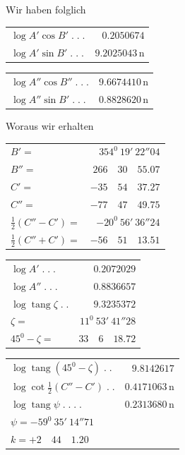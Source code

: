 \noindent Wir haben folglich
\begin{center}\small
\begin{minipage}[t]{.49\textwidth}\centering
\begin{tabular}[t]{@{}lr@{}}
$\log A'\cos B'\;.\;.\;.$&$0.2050674$\\
$\log A'\sin B'\;.\;.\;.$&$9.2025043\,\mathrm n$
\end{tabular}
\end{minipage}\hfill
\begin{minipage}[t]{.49\textwidth}\centering
\begin{tabular}[t]{@{}lr@{}}
$\log A''\cos B''\;.\;.\;.$&$9.6674410\,\mathrm n$\\
$\log A''\sin B'\;.\;.\;.$&$0.8828620\,\mathrm n$
\end{tabular}
\end{minipage}
\end{center}
\noindent Woraus wir erhalten
\begin{center}\small
\begin{minipage}[t]{.49\textwidth}\centering
\begin{tabular}[t]{@{}lr@{}}
$B'=$&$354^0\ 19'\ 22''04$\\
$B''=$&$266\quad30\quad55.07$\\[6pt]
$C'=$&$-35\quad54\quad37.27$\\
$C''=$&$-77\quad47\quad49.75$\\[6pt]
$\tfrac12(C''-C')=$&$-20^0\ 56'\ 36''24$\\
$\tfrac12(C''+C')=$&$-56\quad51\quad13.51$
\end{tabular}
\end{minipage}\hfill
\begin{minipage}[t]{.49\textwidth}\centering
\begin{tabular}[t]{@{}lr@{}}
$\log A'\;.\;.\;.$&$0.2072029$\\
$\log A''\;.\;.\;.$&$0.8836657$\\[6pt]
$\log\operatorname{tang}\zeta\;.\;.$&$9.3235372$\\
$\zeta=$&$11^0\ 53'\ 41''28$\\[6pt]
$45^0-\zeta=$&$33\quad6\quad18.72$
\end{tabular}
\end{minipage}
\par\medskip
\begin{tabular}{lr}
$\log\operatorname{tang}(45^0-\zeta)\;.\;.$&$9.8142617$\\
$\log\cot\tfrac12(C''-C')\;.\;.$&$0.4171063\,\mathrm n$\\\hline
$\log\operatorname{tang}\psi\;.\;.\;.\;.$&$0.2313680\,\mathrm n$\\
\multicolumn{2}{l}{$\psi=-59^0\ 35'\ 14''71$}\\
\multicolumn{2}{l}{$k=+2\quad44\quad1.20$}
\end{tabular}
\end{center}
